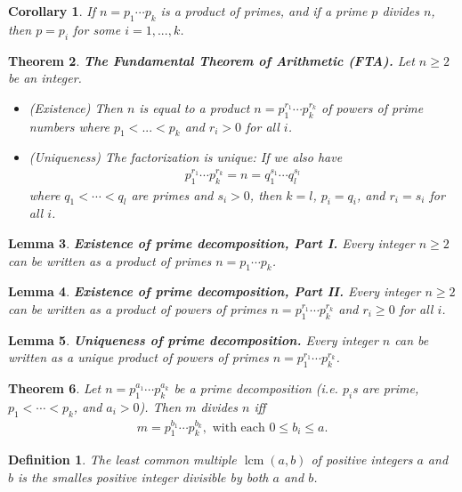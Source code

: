 \documentclass{article}
\theoremstyle{sltheorem}
\newtheorem{definition}{Definition}[section]
\newtheorem{theorem}{Theorem}[section]
\newtheorem{lemma}[theorem]{Lemma}
\newtheorem{corollary}[theorem]{Corollary}
\DeclareMathOperator{\lcm}{lcm}
\begin{document}
\begin{corollary}
    If $n=p_1\cdots p_k$ is a product of primes, and if a prime $p$ divides $n$, then $p=p_i$ for some $i=1,...,k$.
\end{corollary}
\begin{theorem}
    \textbf{The Fundamental Theorem of Arithmetic (FTA).} Let $n\geq 2$ be an integer.
    \begin{itemize}
        \item (Existence) Then $n$ is equal to a product $n=p_1^{r_1}\cdots p_k^{r_k}$ of powers of prime numbers where $p_1<...<p_k$ and $r_i>0$ for all $i$.
        \item (Uniqueness) The factorization is unique: If we also have
        \begin{align*}
            p_1^{r_1}\cdots p_k^{r_k}=n=q_1^{s_1}\cdots q_l^{s_l}
        \end{align*}
        where $q_1<\cdots <q_l$ are primes and $s_i>0$, then $k=l$, $p_i=q_i$, and $r_i=s_i$ for all $i$.
    \end{itemize}
\end{theorem}
\begin{lemma}
    \textbf{Existence of prime decomposition, Part I.} Every integer $n\geq 2$ can be written as a product of primes $n=p_1\cdots p_k$.
\end{lemma}
\begin{lemma}
    \textbf{Existence of prime decomposition, Part II.} Every integer $n\geq 2$ can be written as a product of powers of primes $n=p_1^{r_1}\cdots p_k^{r_k}$ and $r_i\geq 0$ for all $i$.
\end{lemma}
\begin{lemma}
    \textbf{Uniqueness of prime decomposition.} Every integer $n$ can be written as a unique product of powers of primes $n=p_1^{r_1}\cdots p_k^{r_k}$.
\end{lemma}
\begin{theorem}
    Let $n=p_1^{a_1}\cdots p_k^{a_k}$ be a prime decomposition (i.e. $p_i$s are prime, $p_1<\cdots<p_k$, and $a_i>0$). Then $m$ divides $n$ iff 
    \begin{align*}
        m=p_1^{b_1}\cdots p_k^{b_k}, \text{ with each }0\leq b_i \leq a.
    \end{align*}
\end{theorem}
\begin{definition}
    The least common multiple $\lcm(a,b)$ of positive integers $a$ and $b$ is the smalles positive integer divisible by both $a$ and $b$.
\end{definition}
\end{document}
